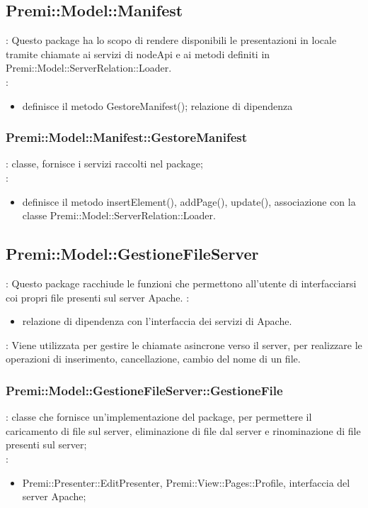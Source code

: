 \subsection{Premi::Model::Manifest}{
   	\textbf{\tipo}: Questo package ha lo scopo di rendere disponibili le presentazioni in locale tramite chiamate ai servizi di nodeApi e ai metodi definiti in Premi::Model::ServerRelation::Loader. \\
   	\textbf{\relaz}:
   	\begin{itemize}
   		\item definisce il metodo GestoreManifest(); relazione di dipendenza 
   	\end{itemize}

	\subsubsection{Premi::Model::Manifest::GestoreManifest}{
		\textbf{\tipo}: classe, fornisce i servizi raccolti nel package;\\
		\textbf{\relaz}:
		\begin{itemize}
			\item definisce il metodo insertElement(), addPage(), update(), associazione con la classe Premi::Model::ServerRelation::Loader.
		\end{itemize}
        }
}
\subsection{Premi::Model::GestioneFileServer} {
   	\textbf{\tipo}: Questo package racchiude le funzioni che permettono all'utente di interfacciarsi coi propri file presenti sul server Apache.
   	\textbf{\relaz}:
   	\begin{itemize}
   		\item relazione di dipendenza con l'interfaccia dei servizi di Apache.
   	\end{itemize}
   	\textbf{\interfacce}: Viene utilizzata per gestire le chiamate asincrone verso il server, per realizzare le operazioni di inserimento, cancellazione, cambio del nome di un file.\\
	
	\subsubsection{Premi::Model::GestioneFileServer::GestioneFile}{
		\textbf{\tipo}: classe che fornisce un'implementazione del package, per permettere il caricamento di file sul server, eliminazione di file dal server e rinominazione di file presenti sul server; \\
		\textbf{\relaz}:
		\begin{itemize}
			\item Premi::Presenter::EditPresenter, Premi::View::Pages::Profile, interfaccia del server Apache;
		\end{itemize}
	}
}

	